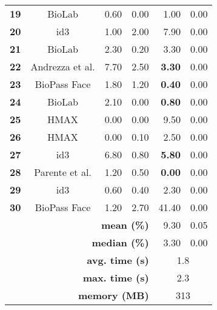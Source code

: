\begin{table}[tb]
\begin{tabular}{ccrrrr}
\textbf{19} & BioLab & 0.60 & {\color[HTML]{9B9B9B} 0.00} & 1.00 & {\color[HTML]{9B9B9B} 0.00} \\
\textbf{20} & id3 & 1.00 & {\color[HTML]{9B9B9B} 2.00} & 7.90 & {\color[HTML]{9B9B9B} 0.00} \\
\textbf{21} & BioLab & 2.30 & {\color[HTML]{9B9B9B} 0.20} & 3.30 & {\color[HTML]{9B9B9B} 0.00} \\
\textbf{22} & Andrezza et al. & 7.70 & {\color[HTML]{9B9B9B} 2.50} & \textbf{3.30} & {\color[HTML]{9B9B9B} 0.00} \\
\textbf{23} & BioPass Face & 1.80 & {\color[HTML]{9B9B9B} 1.20} & \textbf{0.40} & {\color[HTML]{9B9B9B} 0.00} \\
\textbf{24} & BioLab & 2.10 & {\color[HTML]{9B9B9B} 0.00} & \textbf{0.80} & {\color[HTML]{9B9B9B} 0.00} \\
\textbf{25} & HMAX & 0.00 & {\color[HTML]{9B9B9B} 0.00} & 9.50 & {\color[HTML]{9B9B9B} 0.00} \\
\textbf{26} & HMAX & 0.00 & {\color[HTML]{9B9B9B} 0.10} & 2.50 & {\color[HTML]{9B9B9B} 0.00} \\
\textbf{27} & id3 & 6.80 & {\color[HTML]{9B9B9B} 0.80} & \textbf{5.80} & {\color[HTML]{9B9B9B} 0.00} \\
\textbf{28} & Parente et al. & 1.20 & {\color[HTML]{9B9B9B} 0.50} & \textbf{0.00} & {\color[HTML]{9B9B9B} 0.00} \\
\textbf{29} & id3 & 0.60 & {\color[HTML]{9B9B9B} 0.40} & 2.30 & {\color[HTML]{9B9B9B} 0.00} \\
\textbf{30} & BioPass Face & 1.20 & {\color[HTML]{9B9B9B} 2.70} & 41.40 & {\color[HTML]{9B9B9B} 0.00} \\ \hline
\multicolumn{4}{r}{\textbf{mean (\%)}} & 9.30 & 0.05 \\
\multicolumn{4}{r}{\textbf{median (\%)}} & 3.30 & 0.00 \\
\multicolumn{4}{r}{\textbf{avg. time (s)}} & \multicolumn{2}{c}{1.8} \\
\multicolumn{4}{r}{\textbf{max. time (s)}} & \multicolumn{2}{c}{2.3} \\
\multicolumn{4}{r}{\textbf{memory (MB)}} & \multicolumn{2}{c}{313}
\end{tabular}
\end{table}